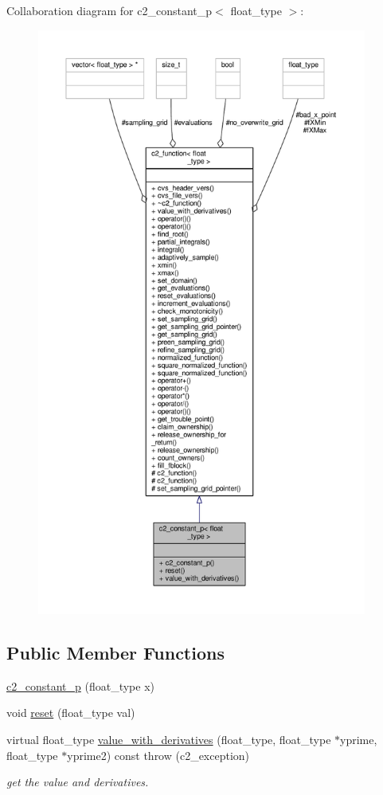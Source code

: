 Collaboration diagram for c2\+\_\+constant\+\_\+p$<$ float\+\_\+type $>$\+:
\nopagebreak
\begin{figure}[H]
\begin{center}
\leavevmode
\includegraphics[height=550pt]{classc2__constant__p__coll__graph}
\end{center}
\end{figure}
\subsection*{Public Member Functions}
\begin{DoxyCompactItemize}
\item 
\hyperlink{classc2__constant__p_ae62311ccce870ca4fb79b7c9d525a3d2}{c2\+\_\+constant\+\_\+p} (float\+\_\+type x)
\item 
void \hyperlink{classc2__constant__p_a5dd45be662a8358a43e25bab057e3aa9}{reset} (float\+\_\+type val)
\item 
virtual float\+\_\+type \hyperlink{classc2__constant__p_a75ec878f6eb48c5ea0187197c645dd66}{value\+\_\+with\+\_\+derivatives} (float\+\_\+type, float\+\_\+type $\ast$yprime, float\+\_\+type $\ast$yprime2) const   throw (c2\+\_\+exception)
\begin{DoxyCompactList}\small\item\em get the value and derivatives. \end{DoxyCompactList}\end{DoxyCompactItemize}
